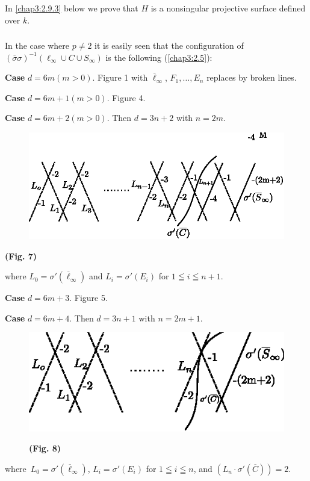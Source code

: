 \subsubsection{}\label{chap3:2.6.3}
In \ref{chap3:2.9.3} below we prove that $H$ is a nonsingular projective
surface defined over $k$.

\subsubsection{}\label{chap3:2.6.4}
In the case where $p\neq 2$ it is easily seen that the configuration
of $(\overline{\sigma}\sigma)^{-1}(\ell_{\infty}\cup C\cup
S_{\infty})$ is the following (\cf \ref{chap3:2.5}):

{\bf Case} $d=6m(m>0)$. Figure 1 with $\overline{\ell}_{\infty}$,
$F_{1},\ldots,E_{n}$ replaces by broken lines.

{\bf Case} $d=6m+1(m>0)$. Figure 4.

{\bf Case} $d=6m+2(m>0)$. Then $d=3n+2$ with $n=2m$.
\begin{figure}[H]
\centering
\includegraphics[scale=1]{figures/miyansi_fig7.eps}
\end{figure}

\centerline{\bf(Fig. 7)}

\noindent
where $L_{0}=\sigma'(\overline{\ell}_{\infty})$ and
$L_{i}=\sigma'(E_{i})$ for $1\leqq i\leqq n+1$. 

{\bf Case} $d=6m+3$. Figure 5.

{\bf Case} $d=6m+4$. Then $d=3n+1$ with $n=2m+1$.
\begin{figure}[H]
\centering
\includegraphics[scale=1.2]{figures/miyansi_fig8.eps}

\bigskip
\centerline{\bf(Fig. 8)}
\end{figure}
\noindent
where\pageoriginale\ $L_{0}=\sigma'(\overline{\ell}_{\infty})$,
$L_{i}=\sigma'(E_{i})$ for $1\leqq i\leqq n$, and
$(L_{n}\cdot\sigma'(\overline{C}))=2$. 

